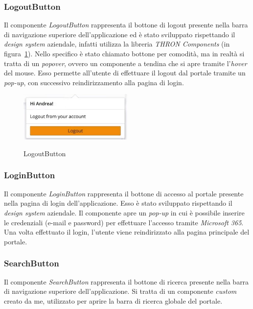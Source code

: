 \subsubsection{LogoutButton}\label{subsubsec:logout-button}
Il componente \textit{LogoutButton} rappresenta il bottone di logout presente nella barra di navigazione superiore 
dell'applicazione ed è stato sviluppato rispettando il \textit{design system} 
aziendale, infatti utilizza la libreria \textit{THRON Components} (in figura~\ref{fig:logout-button}).
Nello specifico è stato chiamato bottone per comodità, ma in realtà si tratta di un \textit{popover}, ovvero un componente a tendina che si apre
tramite l'\textit{hover} del mouse. Esso permette all'utente di effettuare il logout dal portale tramite un \textit{pop-up}, con successivo reindirizzamento
alla pagina di login.

\begin{figure}[ht]
  \centering
  \includegraphics[width=0.5\textwidth, alt={Popover per il logout dall'applicazione}]{images/frontend/logout.jpg}
  \caption{LogoutButton}\label{fig:logout-button}
\end{figure}

\subsubsection{LoginButton}\label{subsubsec:login-button}
Il componente \textit{LoginButton} rappresenta il bottone di accesso al portale presente nella pagina di login dell'applicazione. Esso è stato sviluppato rispettando il \textit{design system} aziendale.
Il componente apre un \textit{pop-up} in cui è possibile inserire le credenziali (e-mail e password) per effettuare l'accesso tramite \textit{Microsoft 365}.
Una volta effettuato il login, l'utente viene reindirizzato alla pagina principale del portale.

\subsubsection{SearchButton}\label{subsubsec:search-button}
Il componente \textit{SearchButton} rappresenta il bottone di ricerca presente nella barra di navigazione superiore dell'applicazione.
Si tratta di un componente \textit{custom} creato da me, utilizzato per aprire la barra di ricerca globale del portale. 

